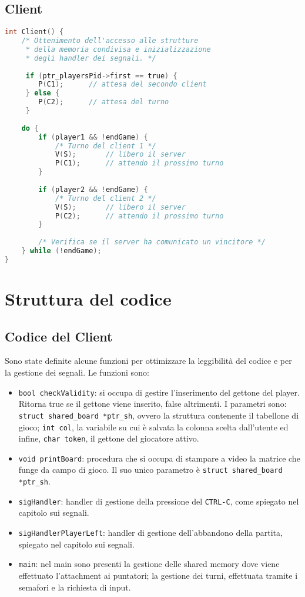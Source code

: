 \documentclass[a4paper,11pt]{article}
\begin{document}
\subsection*{Client}
\begin{lstlisting}[language=C]
int Client() {
	/* Ottenimento dell'accesso alle strutture
	 * della memoria condivisa e inizializzazione
	 * degli handler dei segnali. */
	 
	 if (ptr_playersPid->first == true) {
	 	P(C1);		// attesa del secondo client
	 } else {
	 	P(C2); 		// attesa del turno
	 }
	
	do {
		if (player1 && !endGame) {
			/* Turno del client 1 */
			V(S);		// libero il server
			P(C1);		// attendo il prossimo turno
		}
		
		if (player2 && !endGame) {
			/* Turno del client 2 */
			V(S);		// libero il server
			P(C2);		// attendo il prossimo turno
		}	
		
		/* Verifica se il server ha comunicato un vincitore */
	} while (!endGame);	
}

\end{lstlisting}
	
\section{Struttura del codice}
\subsection{Codice del Client}
Sono state definite alcune funzioni per ottimizzare la leggibilit\`a del codice e per la gestione dei segnali. Le funzioni sono:
\begin{itemize}
\item \texttt{bool checkValidity}: si occupa di gestire l'inserimento del gettone del player. Ritorna true se il gettone viene inserito, false altrimenti. I parametri sono: \texttt{struct shared\_board *ptr\_sh}, ovvero la struttura contenente il tabellone di gioco; \texttt{int col}, la variabile su cui \`e salvata la colonna scelta dall'utente ed infine, \texttt{char token}, il gettone del giocatore attivo.
\item \texttt{void printBoard}: procedura che si occupa di stampare a video la matrice che funge da campo di gioco. Il suo unico parametro \`e \texttt{struct shared\_board *ptr\_sh}.
\item \texttt{sigHandler}: handler di gestione della pressione del \texttt{CTRL-C}, come spiegato nel capitolo sui segnali.
\item \texttt{sigHandlerPlayerLeft}: handler di gestione dell'abbandono della partita, spiegato nel capitolo sui segnali.
\item \texttt{main}: nel main sono presenti la gestione delle shared memory dove viene effettuato l'attachment ai puntatori; la gestione dei turni, effettuata tramite i semafori e la richiesta di input.
\end{itemize}
\end{document}
